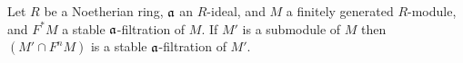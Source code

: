 \begin{cor}\label{cor:completion_is_complete}
\end{cor}

\begin{thm}\label{thm:artin_rees_lemma}
Let $R$ be a Noetherian ring, $\mathfrak{a}$ an $R$-ideal, and $M$ a
finitely generated $R$-module, and $F^*M$ a stable 
$\mathfrak{a}$-filtration of $M$. If $M'$ is a submodule of $M$ then
$(M' \cap F^nM)$ is a stable $\mathfrak{a}$-filtration of $M'$.
\end{thm}
